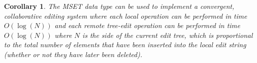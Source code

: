 \documentclass{amsart}
\newtheorem{corollary}[theorem]{Corollary}
\begin{document}
\begin{corollary}
The MSET data type can be used to implement a convergent, collaborative editing system where each local operation can be performed in time $O(\log(N))$ and each remote tree-edit operation can be performed in time $O(\log(N))$ where $N$ is the side of the current edit tree, which is proportional to the total number of elements that have been inserted into the local edit string (whether or not they have later been deleted).
\end{corollary}

%
\end{document}
